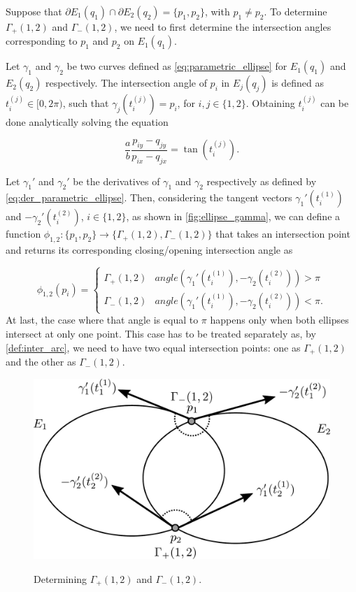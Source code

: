 Suppose that $\partial E_1(q_1) \cap \partial E_2(q_2) = \{p_1, p_2\}$, with $p_1 \neq p_2$. To determine $\Gamma_+(1,2)$ and $\Gamma_-(1,2)$, we need to first determine the intersection angles corresponding to $p_1$ and $p_2$ on $E_1(q_1)$. 

Let $\gamma_1$ and $\gamma_2$ be two curves defined as \autoref{eq:parametric_ellipse} for $E_1(q_1)$ and $E_2(q_2)$ respectively. 
The intersection angle of $p_i$ in $E_j(q_j)$ is defined as $t_i^{(j)} \in [0, 2\pi)$, such that $\gamma_j(t_i^{(j)}) = p_i$, for $i, j \in \{1, 2\}$. Obtaining $t_i^{(j)}$ can be done analytically solving the equation

\begin{equation*}
	\dfrac{a}{b}\dfrac{p_{iy}-q_{jy}}{p_{ix}-q_{jx}} = \tan{(t_i^{(j)})}.
\end{equation*}

Let $\gamma_1'$ and $\gamma_2'$ be the derivatives of $\gamma_1$ and $\gamma_2$ respectively as defined by \autoref{eq:der_parametric_ellipse}. Then, considering the tangent vectors $\gamma_1'(t_i^{(1)})$ and $-\gamma_2'(t_i^{(2)})$, $i\in \{1, 2\}$, as shown in \autoref{fig:ellipse_gamma}, we can define a function $\phi_{1,2}\colon \{p_1, p_2\} \to \{\Gamma_+(1,2), \Gamma_-(1,2)\}$ that takes an intersection point and returns its corresponding closing/opening intersection angle as

\begin{equation*}
\phi_{1,2}(p_i) = \begin{cases}
\Gamma_+(1,2) & angle(\gamma_1'(t_i^{(1)}), -\gamma_2(t_i^{(2)})) > \pi\\
\Gamma_-(1,2) & angle(\gamma_1'(t_i^{(1)}), -\gamma_2(t_i^{(2)})) < \pi.
\end{cases}
\end{equation*}
At last, the case where that angle is equal to $\pi$ happens only when both ellipses intersect at only one point. This case has to be treated separately as, by \autoref{def:inter_arc}, we need to have two equal intersection points: one as $\Gamma_+(1,2)$ and the other as $\Gamma_-(1,2)$.

\begin{figure}
	\centering
	
	\caption{Determining $\Gamma_+(1,2)$ and $\Gamma_-(1,2)$.}
	\includegraphics[scale=.38]{tex/figures/ellipse_gamma.pdf}
	\fautor
	\label{fig:ellipse_gamma}
\end{figure}

